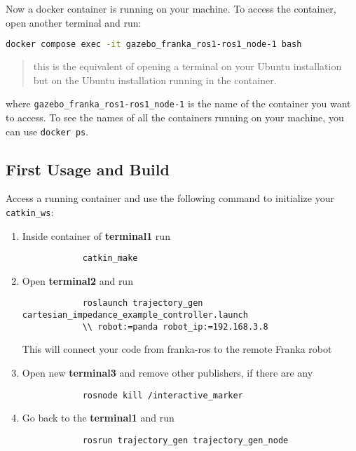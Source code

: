 Now a docker container is running on your machine. To access the container, open another terminal and run:
\begin{lstlisting}[language=bash]
docker compose exec -it gazebo_franka_ros1-ros1_node-1 bash
\end{lstlisting}

\begin{quote}
this is the equivalent of opening a terminal on your Ubuntu installation but on the Ubuntu installation running in the container.
\end{quote}

where \texttt{gazebo\_franka\_ros1-ros1\_node-1} is the name of the container you want to access. To see the names of all the containers running on your machine, you can use \texttt{docker ps}.

\subsection{First Usage and Build}
Access a running container and use the following command to initialize your \texttt{catkin\_ws}:

\begin{enumerate}
    \item Inside container of \textbf{terminal1} run 
        \begin{lstlisting}
            catkin_make    
        \end{lstlisting}
    \item Open \textbf{terminal2} and run 
        \begin{lstlisting}
            roslaunch trajectory_gen cartesian_impedance_example_controller.launch
            \\ robot:=panda robot_ip:=192.168.3.8
        \end{lstlisting}
        This will connect your code from franka-ros to the remote Franka robot
    \item Open new \textbf{terminal3} and remove other publishers, if there are any
        \begin{lstlisting}
            rosnode kill /interactive_marker
        \end{lstlisting}
    \item Go back to the \textbf{terminal1} and run 
        \begin{lstlisting}
            rosrun trajectory_gen trajectory_gen_node
        \end{lstlisting}
    \end{enumerate}


